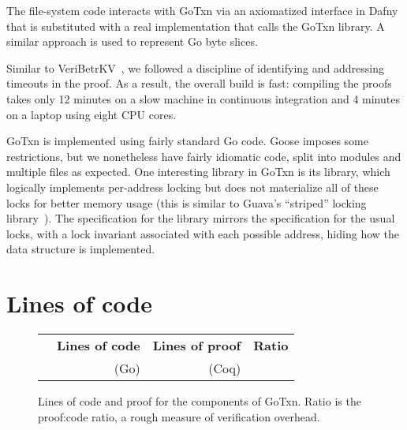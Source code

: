 The file-system code interacts with GoTxn via an axiomatized interface in Dafny
that is substituted with a real implementation that calls the GoTxn library. A
similar approach is used to represent Go byte slices.

Similar to VeriBetrKV~\cite{hance:veribetrkv}, we followed a
discipline of identifying and addressing timeouts in the proof.
As a result, the overall
build is fast: compiling the proofs takes only 12 minutes on a slow
machine in continuous integration and 4 minutes on a laptop
using eight CPU cores.


GoTxn is implemented using fairly standard Go code. Goose imposes some
restrictions, but we nonetheless have fairly idiomatic code, split into modules
and multiple files as expected. One interesting library in GoTxn is its
 library, which logically implements per-address locking but does
not materialize all of these locks for better memory usage (this is similar to
Guava's ``striped'' locking library~\cite{guava-striped}). The specification for
the library mirrors the specification for the usual locks, with a lock invariant
associated with each possible address, hiding how the data structure is
implemented.

\section{Lines of code}


\begin{figure}
\centering
\begin{tabular}{lrrr}
\toprule
  & \bf Lines of code & \bf Lines of proof & \bf Ratio \\
  & (Go) & (Coq) & \\
\midrule
  
\end{tabular}
\caption{Lines of code and proof for the components of GoTxn.
Ratio is the proof:code ratio, a rough measure of verification overhead.}
\label{fig:txn:loc}
\end{figure}


